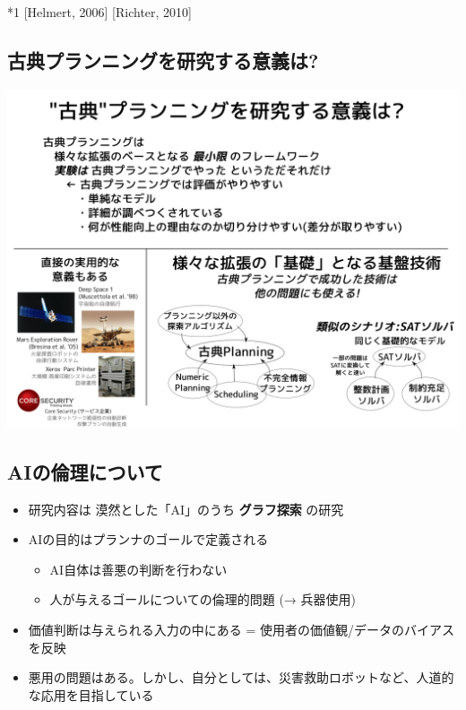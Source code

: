 \begin{note}
*1 [Helmert, 2006] [Richter, 2010]
\end{note}


\subsection{古典プランニングを研究する意義は?}
\label{sec:orgheadline54}

\includegraphics{img/classical-meaning.png}

\subsection{AIの倫理について}
\label{sec:orgheadline55}

\begin{itemize}
\item 研究内容は 漠然とした「AI」のうち \textbf{グラフ探索} の研究
\item AIの目的はプランナのゴールで定義される
\begin{itemize}
\item AI自体は善悪の判断を行わない
\item 人が与えるゴールについての倫理的問題 (→ 兵器使用)
\end{itemize}
\item 価値判断は与えられる入力の中にある = 使用者の価値観/データのバイアスを反映
\item 悪用の問題はある。しかし、自分としては、災害救助ロボットなど、人道的な応用を目指している
\end{itemize}

